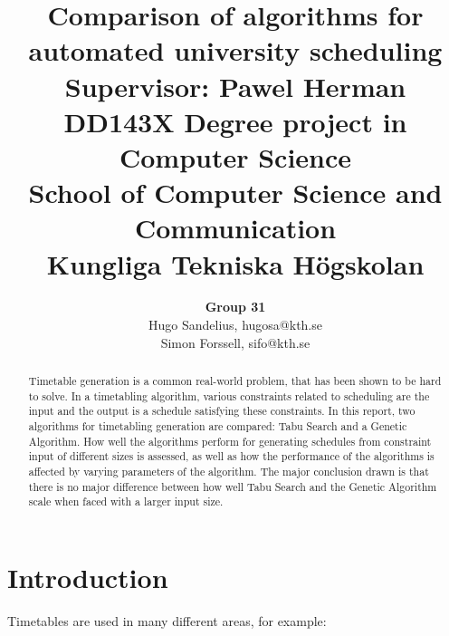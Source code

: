 \documentclass[titlepage,a4paper]{article}
\title{
\Huge{Comparison of algorithms for automated university scheduling}
    \bigskip
	\large{
	\textbf{Supervisor:} Pawel Herman \\
	DD143X Degree project in Computer Science \\
	School of Computer Science and Communication \\
	Kungliga Tekniska Högskolan
	}
}
\author{
\textbf{Group 31} \\
Hugo Sandelius, hugosa@kth.se \\ 
Simon Forssell, sifo@kth.se \\
}
\begin{document}
\maketitle

\begin{abstract}
Timetable generation is a common real-world problem, that has been shown to be hard to solve. In a timetabling algorithm, various constraints related to scheduling are the input and the output is a schedule satisfying these constraints.
In this report, two algorithms for timetabling generation are compared: Tabu Search and a Genetic Algorithm. How well the algorithms perform for generating schedules from constraint input of different sizes is assessed, as well as how the performance of the algorithms is affected by varying parameters of the algorithm.
The major conclusion drawn is that there is no major difference between how well Tabu Search and the Genetic Algorithm scale when faced with a larger input size.
\end{abstract}

\tableofcontents{}

\pagebreak
\section{Introduction}
Timetables are used in many different areas, for example:
\end{document}
